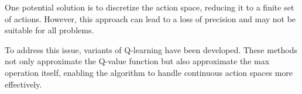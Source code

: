 \documentclass{article}
\begin{document}
One potential solution is to discretize the action space, reducing it to a finite set of actions. However, this approach can lead to a loss of precision and may not be suitable for all problems.

To address this issue, variants of Q-learning have been developed. These methods not only approximate the Q-value function but also approximate the max operation itself, enabling the algorithm to handle continuous action spaces more effectively.




\end{document}
